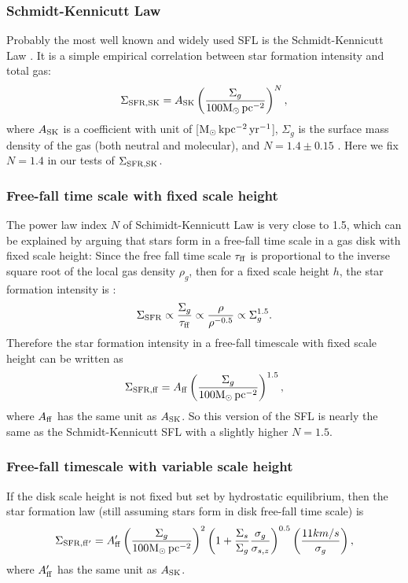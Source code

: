 \documentclass[12pt,preprint]{aastex}
\begin{document}
\label{SFLs}
\subsubsection{Schmidt-Kennicutt Law}
Probably the most well known and widely used SFL is the Schmidt-Kennicutt Law \citep{sch59, ken98}. It is a simple empirical correlation between star formation intensity and total gas:
\begin{equation}
\Sigma_{\rm SFR,SK}=A_{\rm SK} \left (\frac{\Sigma_g}{\rm 100 M_{\odot}\, pc^{-2}}\right )^N,
\end{equation}
where $A_{\rm SK}$ is a coefficient with unit of [${\rm M_{\odot}\, kpc^{-2}\, yr^{-1}}$],  $\Sigma_g$ is the surface mass density of the gas (both neutral and molecular), 
and $N=1.4\pm0.15$ \citep{ken98}. Here we fix $N = 1.4$ in our tests of $\Sigma_{\rm SFR,SK}$.

\subsubsection{Free-fall time scale with fixed scale height}
The power law index $N$ of Schimidt-Kennicutt Law is very close to 1.5, which can be explained by arguing that stars form in a free-fall time scale in a gas disk with fixed scale height: Since the free fall time scale $\tau_{\rm ff}$ is proportional to the inverse square root of the local gas density $\rho_g$, then for a fixed scale height $h$, the star formation intensity is \citep{ler08}:
\begin{equation}
\Sigma_{\rm SFR}\propto \frac{\Sigma_g}{\tau_{\rm ff}} \propto \frac{\rho}{\rho^{-0.5}} \propto\Sigma_g^{1.5}.
\end{equation}
Therefore the star formation intensity in a free-fall timescale with fixed scale height can be written as
\begin{equation}
\Sigma_{\rm SFR,ff}=A_{\rm ff}  \left (\frac{\Sigma_g}{\rm 100 M_{\odot}\, pc^{-2}}\right )^{1.5},
\end{equation}
where $A_{\rm ff}$ has the same unit as $A_{\rm SK}$. So this version of the SFL is nearly the same as the Schmidt-Kennicutt SFL with a slightly higher $N = 1.5$.

\subsubsection{Free-fall timescale with variable scale height}
If the disk scale height is not fixed but set by hydrostatic equilibrium, then the star formation law (still assuming stars form in disk free-fall time scale) is \citep{ler08}
\begin{equation}
\Sigma_{\rm SFR,ff'}=A_{\rm ff}^{\prime} \left (\frac{\Sigma_g}{\rm 100 M_{\odot}\, pc^{-2}} \right)^2 \left (1+\frac{\Sigma_s}{\Sigma_g} \frac{\sigma_g}{\sigma_{s,z}}\right )^{0.5}  \left (\frac{11km/s}{\sigma_g} \right),
\end{equation}
where $A_{\rm ff}^{\prime} $ has the same unit as $A_{\rm SK}$.
\end{document}

